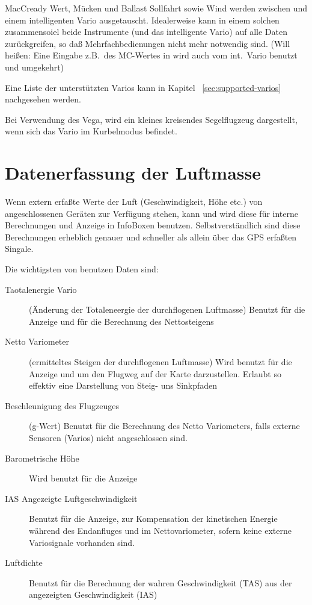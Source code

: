 MacCready Wert, Mücken und Ballast Sollfahrt sowie Wind werden zwischen  \xc und einem
intelligenten Vario ausgetauscht. Idealerweise kann in einem solchen zusammensoiel beide Instrumente (\xc und das
intelligente Vario) auf alle Daten zurückgreifen, so daß Mehrfachbedienungen nicht mehr notwendig sind.
(Will heißen: Eine Eingabe z.B.\ des MC-Wertes in  \xc wird auch vom int.\ Vario benutzt und umgekehrt)

Eine Liste der unterstützten Varios kann in Kapitel  ~\ref{sec:supported-varios} nachgesehen werden.

Bei Verwendung des \textsf{Vega}, wird ein kleines kreisendes Segelflugzeug dargestellt, wenn sich das Vario
im Kurbelmodus befindet.
\section{Datenerfassung der Luftmasse}%

Wenn extern erfaßte Werte der Luft (Geschwindigkeit, Höhe etc.) von angeschlossenen Geräten zur Verfügung
stehen, kann und wird \xc diese für interne Berechnungen und Anzeige in InfoBoxen benutzen.
Selbstverständlich sind diese Berechnungen erheblich genauer und schneller als allein über das GPS
erfaßten Singale.

Die wichtigsten von  \xc benutzen Daten sind:
\begin{description}
\item[Taotalenergie Vario]
(Änderung der Totaleneergie der durchflogenen Luftmasse)
Benutzt für die Anzeige und für die Berechnung des Nettosteigens
\item[Netto Variometer]
(ermitteltes Steigen der durchflogenen Luftmasse)
Wird benutzt für die Anzeige und um den Flugweg auf der Karte darzustellen.
Erlaubt so effektiv eine Darstellung von Steig- uns Sinkpfaden
\item[Beschleunigung des Flugzeuges]
(g-Wert) Benutzt für die Berechnung des Netto Variometers, falls externe Sensoren (Varios) nicht angeschlossen sind.
\item[Barometrische Höhe] Wird benutzt für die Anzeige
\item[IAS Angezeigte Luftgeschwindigkeit]
Benutzt für die Anzeige, zur Kompensation der kinetischen Energie während des Endanfluges  und im Nettovariometer,
sofern keine externe Variosignale vorhanden sind.
\item[Luftdichte] Benutzt für die Berechnung der wahren Geschwindigkeit (TAS) aus der angezeigten Geschwindigkeit (IAS)
\end{description}

